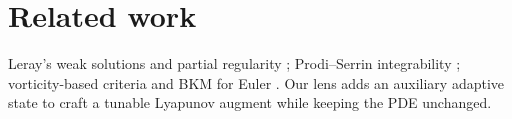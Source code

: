 \section{Related work}
Leray's weak solutions and partial regularity \citep{leray1934,temam1995}; Prodi--Serrin integrability \citep{prodi1959,serrin1962}; vorticity-based criteria and BKM for Euler \citep{bkm1984,constantinfoias1988}.
Our lens adds an auxiliary adaptive state to craft a tunable Lyapunov augment while keeping the PDE unchanged.
